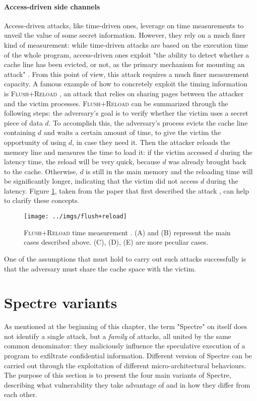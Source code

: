 \documentclass[12pt,a4paper]{book}
\theoremstyle{definition}
\begin{document}
	\paragraph{Access-driven side channels} 
	Access-driven attacks, like time-driven ones, leverage on time measurements to unveil the value of some secret information. However, they rely on a much finer kind of measurement: while time-driven attacks are based on the execution time of the whole program, access-driven ones exploit "the ability to
	detect whether a cache line has been evicted, or not, as the primary
	mechanism for mounting an attack" \cite{Neve2007}. From this point of view, this attack requires a much finer measurement capacity. A famous example of how to concretely exploit the timing information is \textsc{Flush$+$Reload} \cite{Yarom2014}, an attack that relies on sharing pages between the attacker and the victim processes. \textsc{Flush$+$Reload} can be summarized through the following steps: the adversary's goal is to verify whether the victim uses a secret piece of data $d$. To accomplish this, the adversary's process evicts the cache line containing $d$ and waits a certain amount of time, to give the victim the opportunity of using $d$, in case they need it. Then the attacker reloads the memory line and measures the time to load it: if the victim accessed $d$ during the latency time, the reload will be very quick, because $d$ was already brought back to the cache. Otherwise, $d$ is still in the main memory and the reloading time will be significantly longer, indicating that the victim did not access $d$ during the latency. Figure \ref{fig:flush-reload}, taken from the paper that first described the attack \cite{Yarom2014}, can help to clarify these concepts.  
	\begin{figure}
		\centering
		\texttt{[image: ../imgs/flush+reload]}
		\captionsetup{width=.7\linewidth}
		\caption{\textsc{Flush+Reload} time measurement \cite{Yarom2014}. (A) and (B) represent the main cases described above. (C), (D), (E) are more peculiar cases.}
		\label{fig:flush-reload}
	\end{figure}
	One of the assumptions that must hold to carry out such attacks successfully is that the adversary must share the cache space with the victim.
	
	\section{Spectre variants}\label{sec:spectre-var}
	As mentioned at the beginning of this chapter, the term "Spectre" on itself does not identify a single attack, but a \textit{family} of attacks, all united by the same common denominator: they maliciously influence the speculative execution of a program to exfiltrate confidential information. Different version of Spectre can be carried out through the exploitation of different micro-architectural behaviours. The purpose of this section is to present the four main variants of Spectre, describing what vulnerability they take advantage of and in how they differ from each other.
\end{document}

